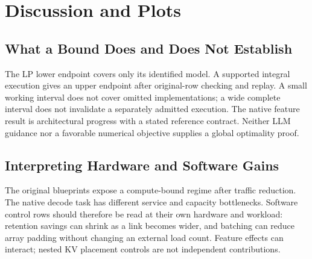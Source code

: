 \section{Discussion and Plots}
\label{app:original_results}\label{app:blueprint_tables}

\subsection{What a Bound Does and Does Not Establish}\label{app:custom_solve}
The LP lower endpoint covers only its identified model. A supported integral
execution gives an upper endpoint after original-row checking and replay.
A small working interval does not cover omitted implementations; a wide complete
interval does not invalidate a separately admitted execution. The native
feature result is architectural progress with a stated reference contract.
Neither LLM guidance nor a favorable numerical objective supplies a global
optimality proof.

\subsection{Interpreting Hardware and Software Gains}
The original blueprints expose a compute-bound regime after traffic reduction.
The native decode task has different service and capacity bottlenecks. Software
control rows should therefore be read at their own hardware and workload:
retention savings can shrink as a link becomes wider, and batching can reduce
array padding without changing an external load count. Feature effects can
interact; nested KV placement controls are not independent contributions.
